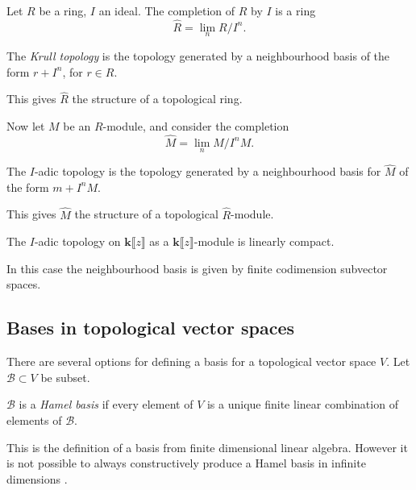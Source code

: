         
        Let \(R\) be a ring, \(I\) an ideal. The completion of \(R\) by \(I\) is a ring 
        \[\widehat{R} = \lim_n R/I^n.\]
        
        \begin{defn}
        The \emph{Krull topology} is the topology generated by a neighbourhood basis of the form \(r + I^n\), for \(r\in R\). 
        \end{defn}
        This gives \( \widehat{R} \) the structure of a topological ring.
    
    
        Now let \(M\) be an \(R\)-module, 
        and consider the completion \[\widehat{M} = \lim_n M/I^n M.\]
        \begin{defn}
        The \(I\)-adic topology is the topology generated by a neighbourhood basis for \(\widehat{M}\) of the form \(m + I^n M\). 
        \end{defn}    
        This gives \(\widehat{M}\) the structure of a topological \(\widehat{R}\)-module.
        
        \begin{thm} The \(I \)-adic topology on \( \mathbf{k} \lBrack z \rBrack\) as a \(  \mathbf{k}\lBrack z \rBrack\)-module is linearly compact.
        \end{thm}
   
        In this case the neighbourhood basis is given by finite codimension subvector spaces.
        
        \fi 
   
   
        
        \iffalse 
        
        \subsection{Bases in topological vector spaces}
        
        There are several options for defining a basis for a topological vector space \(V\). Let \( \mathcal{B} \subset V\) be subset.
        
        \begin{defn}
        \( \mathcal{B}\) is a \emph{Hamel basis} if every element of \(  V\) is a unique finite linear combination of elements of \( \mathcal{B}\).
        \end{defn}
        This is the definition of a basis from finite dimensional linear algebra. However it is not possible to always constructively produce a Hamel basis in infinite dimensions  \cite{basis_vect}.
        
